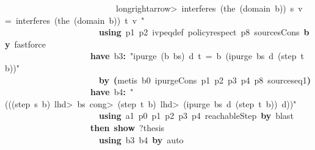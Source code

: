 \documentclass{article}
\newcommand{\syntaxKEYWORDA}[1]{\textcolor[rgb]{0.0,0.4,0.6}{\textbf{#1}}}
\newcommand{\syntaxKEYWORDC}[1]{\textcolor[rgb]{0.0,0.6,1.0}{\textbf{#1}}}
\newcommand{\syntaxLITERALA}[1]{\textcolor[rgb]{1.0,0.0,0.8}{#1}}
\newcommand{\syntaxOPERATOR}[1]{\textcolor[rgb]{0.0,0.0,0.0}{\textbf{#1}}}
\newcommand{\syntaxKEYWORDA}[1]{\textcolor[rgb]{0.0,0.4,0.6}{\textbf{#1}}}
\newcommand{\syntaxKEYWORDC}[1]{\textcolor[rgb]{0.0,0.6,1.0}{\textbf{#1}}}
\newcommand{\syntaxLITERALA}[1]{\textcolor[rgb]{1.0,0.0,0.8}{#1}}
\newcommand{\syntaxOPERATOR}[1]{\textcolor[rgb]{0.0,0.0,0.0}{\textbf{#1}}}
\newcommand{\syntaxKEYWORDA}[1]{\textcolor[rgb]{0.0,0.4,0.6}{\textbf{#1}}}
\newcommand{\syntaxKEYWORDC}[1]{\textcolor[rgb]{0.0,0.6,1.0}{\textbf{#1}}}
\newcommand{\syntaxLITERALA}[1]{\textcolor[rgb]{1.0,0.0,0.8}{#1}}
\newcommand{\syntaxOPERATOR}[1]{\textcolor[rgb]{0.0,0.0,0.0}{\textbf{#1}}}
\newcommand{\syntaxKEYWORDA}[1]{\textcolor[rgb]{0.0,0.4,0.6}{#1}}
\newcommand{\syntaxKEYWORDC}[1]{\textcolor[rgb]{0.0,0.6,1.0}{#1}}
\newcommand{\syntaxLITERALA}[1]{\textcolor[rgb]{1.0,0.0,0.8}{\textbf{#1}}}
\newcommand{\syntaxOPERATOR}[1]{\textcolor[rgb]{0.0,0.0,0.0}{#1}}
\newcommand{\syntaxKEYWORDA}[1]{\textcolor[rgb]{0.0,0.4,0.6}{\textbf{#1}}}
\newcommand{\syntaxKEYWORDC}[1]{\textcolor[rgb]{0.0,0.6,1.0}{\textbf{#1}}}
\newcommand{\syntaxLITERALA}[1]{\textcolor[rgb]{1.0,0.0,0.8}{#1}}
\newcommand{\syntaxOPERATOR}[1]{\textcolor[rgb]{0.0,0.0,0.0}{\textbf{#1}}}
\newcommand{\syntaxKEYWORDA}[1]{\textcolor[rgb]{0.0,0.4,0.6}{\textbf{#1}}}
\newcommand{\syntaxKEYWORDC}[1]{\textcolor[rgb]{0.0,0.6,1.0}{\textbf{#1}}}
\newcommand{\syntaxLITERALA}[1]{\textcolor[rgb]{1.0,0.0,0.8}{#1}}
\newcommand{\syntaxOPERATOR}[1]{\textcolor[rgb]{0.0,0.0,0.0}{\textbf{#1}}}
\begin{document}
\syntaxLITERALA{{\ }{\ }{\ }{\ }{\ }{\ }{\ }{\ }{\ }{\ }{\ }{\ }{\ }{\ }{\ }{\ }{\ }{\ }{\ }{\ }{\ }{\ }{\ }{\ }{\ }{\ }\<longrightarrow>{\ }interferes{\ }(the{\ }(domain{\ }b)){\ }s{\ }v{\ }={\ }interferes{\ }(the{\ }(domain{\ }b)){\ }t{\ }v{\ }"}\hspace*{\fill}\\
{\ }{\ }{\ }{\ }{\ }{\ }{\ }{\ }{\ }{\ }{\ }{\ }{\ }{\ }{\ }{\ }{\ }{\ }{\ }{\ }{\ }{\ }\syntaxKEYWORDA{using}{\ }p1{\ }p2{\ }ivpeq\usebox{\underscorebox}def{\ }policy\usebox{\underscorebox}respect{\ }p8{\ }sources\usebox{\underscorebox}Cons{\ }\syntaxKEYWORDA{by}{\ }fastforce\hspace*{\fill}\\
{\ }{\ }{\ }{\ }{\ }{\ }{\ }{\ }{\ }{\ }{\ }{\ }{\ }{\ }{\ }{\ }{\ }{\ }{\ }{\ }\syntaxKEYWORDA{have}{\ }b3\syntaxOPERATOR{:}{\ }\syntaxLITERALA{"ipurge{\ }(b{\ }\usebox{\hashbox}{\ }bs){\ }d{\ }t{\ }={\ }b{\ }\usebox{\hashbox}{\ }(ipurge{\ }bs{\ }d{\ }(step{\ }t{\ }b))"}\hspace*{\fill}\\
{\ }{\ }{\ }{\ }{\ }{\ }{\ }{\ }{\ }{\ }{\ }{\ }{\ }{\ }{\ }{\ }{\ }{\ }{\ }{\ }{\ }{\ }\syntaxKEYWORDA{by}{\ }\syntaxOPERATOR{(}metis{\ }b0{\ }ipurge\usebox{\underscorebox}Cons{\ }p1{\ }p2{\ }p3{\ }p4{\ }p8{\ }sources\usebox{\underscorebox}eq1\syntaxOPERATOR{)}\hspace*{\fill}\\
{\ }{\ }{\ }{\ }{\ }{\ }{\ }{\ }{\ }{\ }{\ }{\ }{\ }{\ }{\ }{\ }{\ }{\ }{\ }{\ }\syntaxKEYWORDA{have}{\ }b4\syntaxOPERATOR{:}{\ }\syntaxLITERALA{"(((step{\ }s{\ }b){\ }\<lhd>{\ }bs{\ }\<cong>{\ }(step{\ }t{\ }b){\ }\<lhd>{\ }(ipurge{\ }bs{\ }d{\ }(step{\ }t{\ }b)){\ }\usebox{\atbox}{\ }d))"}\hspace*{\fill}\\
{\ }{\ }{\ }{\ }{\ }{\ }{\ }{\ }{\ }{\ }{\ }{\ }{\ }{\ }{\ }{\ }{\ }{\ }{\ }{\ }{\ }{\ }\syntaxKEYWORDA{using}{\ }a1{\ }p0{\ }p1{\ }p2{\ }p3{\ }p4{\ }reachableStep{\ }\syntaxKEYWORDA{by}{\ }blast\hspace*{\fill}\\
{\ }{\ }{\ }{\ }{\ }{\ }{\ }{\ }{\ }{\ }{\ }{\ }{\ }{\ }{\ }{\ }{\ }{\ }{\ }{\ }\syntaxKEYWORDA{then}{\ }\syntaxKEYWORDC{show}{\ }?thesis\hspace*{\fill}\\
{\ }{\ }{\ }{\ }{\ }{\ }{\ }{\ }{\ }{\ }{\ }{\ }{\ }{\ }{\ }{\ }{\ }{\ }{\ }{\ }{\ }{\ }\syntaxKEYWORDA{using}{\ }b3{\ }b4{\ }\syntaxKEYWORDA{by}{\ }auto\hspace*{\fill}\\
\end{document}
